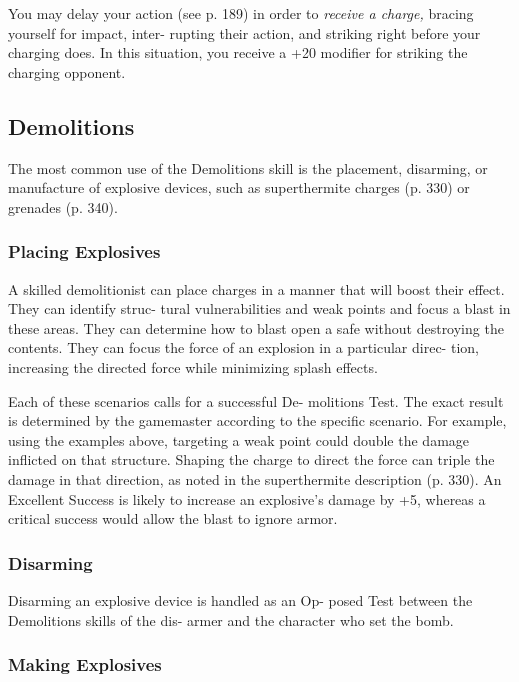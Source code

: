You may delay your action (see p. 189) in order to 
\textit{receive a charge,} bracing yourself for impact, inter-
rupting their action, and striking right before your 
charging does. In this situation, you receive a +20 
modifier for striking the charging opponent.

\subsection{Demolitions}

The most common use of the Demolitions skill is the 
placement, disarming, or manufacture of explosive 
devices, such as superthermite charges (p. 330) or 
grenades (p. 340).

\subsubsection{Placing Explosives}

A skilled demolitionist can place charges in a manner 
that will boost their effect. They can identify struc-
tural vulnerabilities and weak points and focus a 
blast in these areas. They can determine how to blast 
open a safe without destroying the contents. They can 
focus the force of an explosion in a particular direc-
tion, increasing the directed force while minimizing 
splash effects.

Each of these scenarios calls for a successful De-
molitions Test. The exact result is determined by 
the gamemaster according to the specific  scenario. 
For example, using the examples above, targeting 
a weak point could double the damage inflicted on 
that structure. Shaping the charge to direct the force 
can triple the damage in that direction, as noted in 
the superthermite description (p. 330). An Excellent 
Success is likely to increase an explosive's damage by 
+5, whereas a critical success would allow the blast to 
ignore armor.

\subsubsection{Disarming}

Disarming an explosive device is handled as an Op-
posed Test between the Demolitions skills of the dis-
armer and the character who set the bomb.

\subsubsection{Making Explosives}

